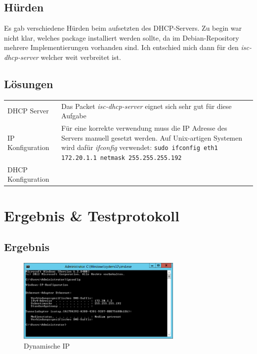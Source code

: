 \documentclass[12pt,a4paper,twoside,titlepage]{article}
\begin{document}
        \subsection{Hürden}

        Es gab verschiedene Hürden beim aufsetzten des DHCP-Servers. Zu begin war nicht klar, welches package installiert werden sollte, da im Debian-Repository mehrere Implementierungen vorhanden sind. Ich entschied mich dann für den \textit{isc-dhcp-server} welcher weit verbreitet ist.
        
        \subsection{Lösungen}

        \begin{tabular}{lp{10cm}}
            DHCP Server & Das Packet \textit{isc-dhcp-server} eignet sich sehr gut für diese Aufgabe \\
            IP Konfiguration & Für eine korrekte verwendung muss die IP Adresse des Servers manuell gesetzt werden. Auf Unix-artigen Systemen wird dafür \textit{ifconfig} verwendet: \texttt{sudo ifconfig eth1 172.20.1.1 netmask 255.255.255.192}\\
            DHCP Konfiguration & 
        \end{tabular}
        
        \section{Ergebnis \& Testprotokoll}

        \subsection{Ergebnis}

        \begin{figure}
          \center
          \label{fig:dynip}
          \includegraphics[width=8cm]{cmd_ipconfig_dynamic_ip}
          \caption{Dynamische IP}
        \end{figure}
\end{document}
